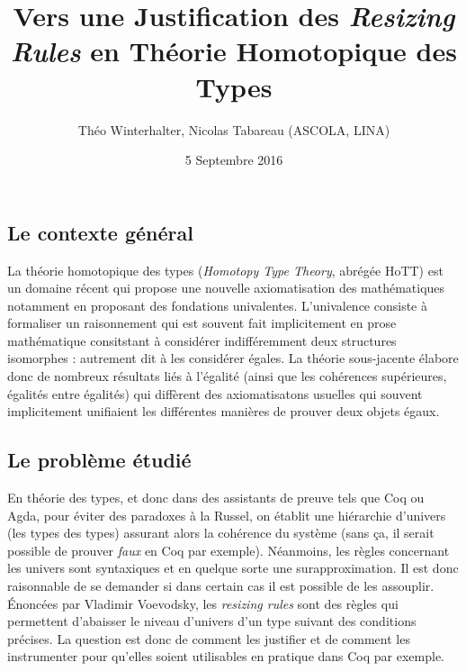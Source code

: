 \documentclass[11pt]{article}
\begin{document}
\title{Vers une Justification des \emph{Resizing Rules} en Théorie Homotopique
       des Types}

\author{Théo Winterhalter, Nicolas Tabareau (ASCOLA, LINA)}

\date{5 Septembre 2016}

\maketitle

\pagestyle{empty} %
\thispagestyle{empty}



\subsection*{Le contexte général}

\sloppy %
La théorie homotopique des types (\emph{Homotopy Type Theory}, abrégée HoTT)
est un domaine récent qui propose une nouvelle axiomatisation des mathématiques
notamment en proposant des fondations univalentes. L'univalence consiste à
formaliser un raisonnement qui est souvent fait implicitement en prose
mathématique consitstant à considérer indifféremment deux structures
isomorphes : autrement dit à les considérer égales.
La théorie sous-jacente élabore donc de nombreux résultats liés à l'égalité
(ainsi que les cohérences supérieures, égalités entre égalités) qui diffèrent
des axiomatisatons usuelles qui souvent implicitement unifiaient les différentes
manières de prouver deux objets égaux.

\subsection*{Le problème étudié}

En théorie des types, et donc dans des assistants de preuve tels que Coq ou
Agda, pour éviter des paradoxes à la Russel, on établit une hiérarchie d'univers
(les types des types) assurant alors la cohérence du système (sans ça, il serait
possible de prouver \emph{faux} en Coq par exemple).
Néanmoins, les règles concernant les univers sont syntaxiques et en quelque
sorte une surapproximation. Il est donc raisonnable de se demander si dans
certain cas il est possible de les assouplir.
Énoncées par Vladimir Voevodsky, les \emph{resizing rules} sont des règles
qui permettent d'abaisser le niveau d'univers d'un type suivant des conditions
précises. La question est donc de comment les justifier et de comment les
instrumenter pour qu'elles soient utilisables en pratique dans Coq par exemple.
\end{document}
